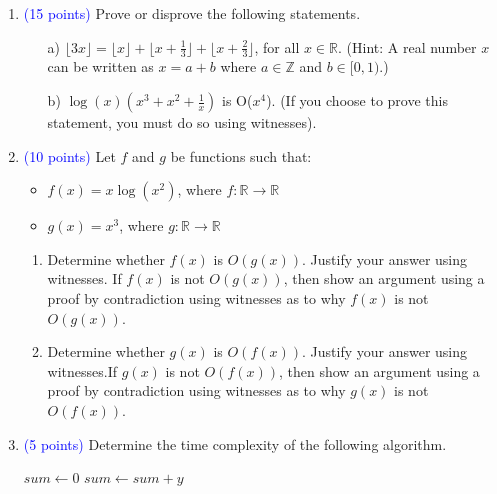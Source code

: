\documentclass{article}
\newcommand{\pt}[1]{\textcolor{blue}{(#1 points)}}
\begin{document}
\begin{enumerate}
\item \pt{15} Prove or disprove the following statements.
\begin{enumerate}
    \item[a)] $\lfloor 3x \rfloor = \lfloor x \rfloor + \lfloor x + \frac{1}{3} \rfloor + \lfloor x + \frac{2}{3} \rfloor$, for all $x \in \mathbb{R}$. (Hint: A real number $x$ can be written as $x = a+ b$ where $a \in \mathbb{Z}$ and $b \in [0,1)$.)
    \item[b)] $\log(x)({x^3 + x^2+}{\frac{1}{x}})$ is O($x^4$). (If you choose to prove this statement, you must do so using witnesses).
\end{enumerate}

\item \pt{10} {Let $f$ and $g$ be functions such that:}
\begin{itemize}
    \item $f(x) = x \log(x^2)$, where $f:\mathbb{R}\to\mathbb{R}$
    \item $g(x) = x^3$, where $g:\mathbb{R}\to\mathbb{R}$
\end{itemize}
\begin{enumerate}
    \item Determine whether $f(x)$ is $O(g(x))$. Justify your answer using witnesses. If $f(x)$ is not $O(g(x))$, then show an argument using a proof by contradiction using witnesses as to why $f(x)$ is not $O(g(x))$.
    \item Determine whether $g(x)$ is $O(f(x))$. Justify your answer using witnesses.If $g(x)$ is not $O(f(x))$, then show an argument using a proof by contradiction using witnesses as to why $g(x)$ is not $O(f(x))$.
\end{enumerate}

\item \pt{5} {Determine the time complexity of the following algorithm.}
    \begin{algorithmic}
    \State $sum \gets 0$
            \State $sum \gets sum + y$
        \EndFor
    \EndFor
    \end{algorithmic}
\end{enumerate}
\end{document}
